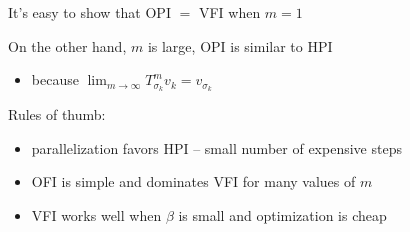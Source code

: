 \documentclass[xcolor=dvipsnames]{beamer}
\newcommand{\1}{\mathbbm 1}
\begin{document}
\begin{frame}



    It's easy to show that OPI $=$ VFI  when $m=1$


    On the other hand, $m$ is large, OPI is similar to HPI 


    \vspace{0.5em}
    \begin{itemize}
        \item because $\lim_{m \to \infty} T^m_{\sigma_k} v_k = v_{\sigma_k}$
    \end{itemize}


    \vspace{0.5em}
    \vspace{0.5em}
    \vspace{0.5em}
    Rules of thumb:

    \begin{itemize}
        \item parallelization favors HPI -- small number of expensive steps
        \vspace{0.5em}
        \item OFI is simple and dominates VFI for many values of $m$
        \vspace{0.5em}
        \item VFI works well when $\beta$ is small and optimization is cheap
    \end{itemize}


\end{frame}
\end{document}
